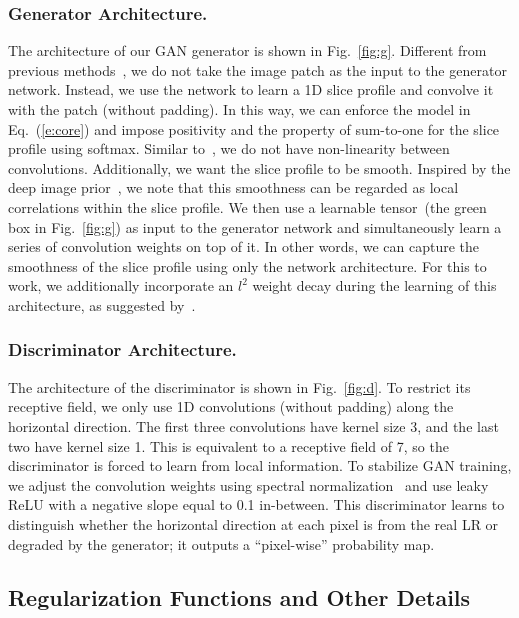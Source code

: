 \documentclass[runningheads]{llncs}
\begin{document}
\subsubsection{Generator Architecture.} The architecture of our GAN
generator is shown in Fig.~\ref{fig:g}. Different from previous
methods~\cite{bell-2019-kernelgan, deng-2020-unpaired,
chen-2020-indirect}, we do not take the image patch as the input to
the generator network. Instead, we use the network to learn a 1D slice
profile and convolve it with the patch (without padding). In this way,
we can enforce the model in Eq.~(\ref{e:core}) and impose positivity
and the property of sum-to-one for the slice profile using softmax.
Similar to~\cite{bell-2019-kernelgan}, we do not have non-linearity
between convolutions. Additionally, we want the slice profile to be
smooth. Inspired by the deep image prior~\cite{ulyanov-2018-dip,
cheng-2019-bayesian, ren-2020-selfdeblur}, we note that this
smoothness can be regarded as local correlations within the slice
profile. We then use a learnable tensor~(the green box in
Fig.~\ref{fig:g}) as input to the generator network and simultaneously
learn a series of convolution weights on top of it. In other words, we
can capture the smoothness of the slice profile using only the network
architecture. For this to work, we additionally incorporate an $l^2$
weight decay during the learning of this architecture, as suggested
by~\cite{cheng-2019-bayesian}.

\subsubsection{Discriminator Architecture.} The architecture of the
discriminator is shown in Fig.~\ref{fig:d}. To restrict its receptive
field, we only use 1D convolutions (without padding) along the
horizontal direction. The first three convolutions have kernel size 3,
and the last two have kernel size 1. This is equivalent to a receptive
field of 7, so the discriminator is forced to learn from local
information. To stabilize GAN training, we adjust the convolution
weights using spectral normalization~\cite{miyato-2018-sn} and use
leaky ReLU with a negative slope equal to 0.1 in-between. This
discriminator learns to distinguish whether the horizontal direction
at each pixel is from the real LR or degraded by the generator; it
outputs a ``pixel-wise'' probability map.

\subsection{Regularization Functions and Other Details}
\end{document}

